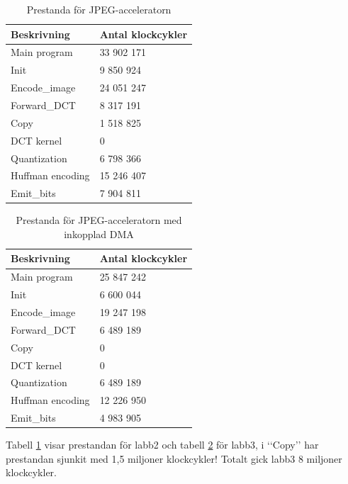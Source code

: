 \documentclass[a4paper]{article}
\begin{document}
\begin{table}[H]
    \centering
    \begin{tabular}{l l}
    
        Beskrivning & Antal klockcykler\\
        \hline
        Main program  & 33 902 171 \\
        Init  &  9 850 924 \\
        Encode\_image  & 24 051 247 \\
        Forward\_DCT  & 8 317 191 \\
        Copy  & 1 518 825 \\
        DCT kernel  & 0 \\
        Quantization  & 6 798 366 \\
        Huffman encoding  & 15 246 407 \\
        Emit\_bits  & 7 904 811 \\
    \end{tabular}
    \caption{ Prestanda för JPEG-acceleratorn }
    \label{tab:jpeg_performance_2}
\end{table}
\begin{table}[H]
    \centering
    \begin{tabular}{l l}
    
        Beskrivning & Antal klockcykler\\
        \hline
        Main program  & 25 847 242 \\
        Init  & 6 600 044 \\
        Encode\_image  & 19 247 198 \\
        Forward\_DCT  & 6 489 189 \\
        Copy  & 0 \\
        DCT kernel  & 0 \\
        Quantization  & 6 489 189 \\
        Huffman encoding  & 12 226 950 \\
        Emit\_bits  & 4 983 905 \\
    \end{tabular}
    \caption{ Prestanda för JPEG-acceleratorn med inkopplad DMA }
    \label{tab:jpeg_performance_3}
\end{table}

Tabell \ref{tab:jpeg_performance_2} visar prestandan för labb2 och tabell \ref{tab:jpeg_performance_3} för labb3, i \lq\lq{}Copy\rq\rq{} har prestandan sjunkit med 1,5 miljoner klockcykler! Totalt gick labb3 8 miljoner klockcykler.
\end{document}
